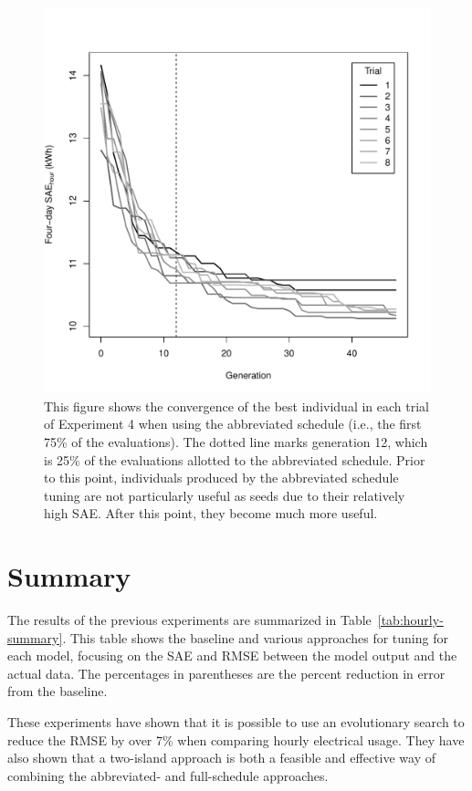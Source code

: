 \documentclass[preprint, review, 12pt]{elsarticle}
\begin{document}
\begin{figure}[htbp]
\centering
\includegraphics[width=5in]{figure2}
\caption{This figure shows the convergence of the best individual in each trial of Experiment 4 when using the abbreviated schedule (i.e., the first 75\% of the evaluations). The dotted line marks generation 12, which is 25\% of the evaluations allotted to the abbreviated schedule. Prior to this point, individuals produced by the abbreviated schedule tuning are not particularly useful as seeds due to their relatively high SAE. After this point, they become much more useful.}
\label{fig:hour-converge}
\end{figure}


\section{Summary}
The results of the previous experiments are summarized in Table~\ref{tab:hourly-summary}. This table shows the baseline and various approaches for tuning for each model, focusing on the SAE and RMSE between the model output and the actual data. The percentages in parentheses are the percent reduction in error from the baseline.

These experiments have shown that it is possible to use an evolutionary search to reduce the RMSE by over 7\% when comparing hourly electrical usage. They have also shown that a two-island approach is both a feasible and effective way of combining the abbreviated- and full-schedule approaches. 
\end{document}
